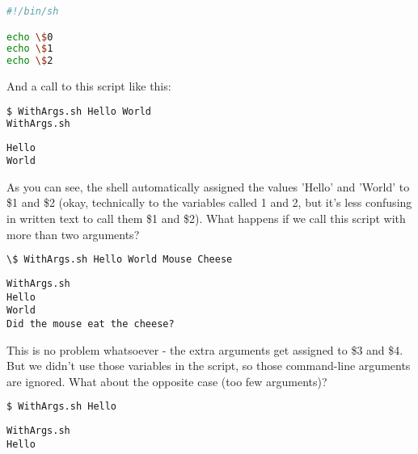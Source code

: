 \lstset{basicstyle=\scriptsize, numbers=left, captionpos=b, tabsize=4}
\begin{lstlisting}[caption=WithArgs.sh: A script that uses command-line arguments,language={bash},
xleftmargin=15pt,label=lst:WithArgs.sh:Ascriptthatusescommand-linearguments]
#!/bin/sh

echo \$0
echo \$1
echo \$2
\end{lstlisting}

And a call to this script like this:
\lstset{basicstyle=\scriptsize, numbers=left, captionpos=b, tabsize=4}
\begin{lstlisting}[caption=Calling the script,language={bash},
xleftmargin=15pt,label=lst:Callingthescript]
$ WithArgs.sh Hello World
WithArgs.sh
\end{lstlisting}
\scriptsize
\begin{verbatim}
Hello
World
\end{verbatim}
\normalsize

As you can see, the shell automatically assigned the values 'Hello' and 'World'
to \$1 and \$2 (okay, technically to the variables called 1 and 2, but it's
less confusing in written text to call them \$1 and \$2). What happens if we
call this script with more than two arguments?

\lstset{basicstyle=\scriptsize, numbers=left, captionpos=b, tabsize=4}
\begin{lstlisting}[caption=Calling the script with more arguments,language={bash},
xleftmargin=15pt, label=lst:Calling the script with more arguments]
\$ WithArgs.sh Hello World Mouse Cheese
\end{lstlisting}
\scriptsize
\begin{verbatim}
WithArgs.sh
Hello
World
Did the mouse eat the cheese?
\end{verbatim}
\normalsize
This is no problem whatsoever - the extra arguments get assigned to \$3 and
\$4. But we didn't use those variables in the script, so those command-line
arguments are ignored. What about the opposite case (too few arguments)?

\lstset{basicstyle=\scriptsize, numbers=left, captionpos=b, tabsize=4}
\begin{lstlisting}[caption=Calling the script with too few arguments...,language={bash},
xleftmargin=15pt,label=lst:Callingthescriptwithtoofewarguments...]
$ WithArgs.sh Hello
\end{lstlisting}
\scriptsize
\begin{verbatim}
WithArgs.sh
Hello
\end{verbatim}
\normalsize

